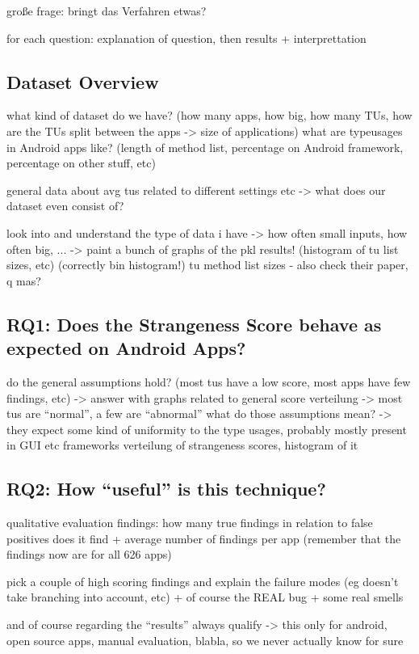 große frage: bringt das Verfahren etwas?

for each question: explanation of question, then results + interprettation
\subsection{Dataset Overview}
what kind of dataset do we have? (how many apps, how big, how many TUs, how are the TUs split between the apps -> size of applications)
what are typeusages in Android apps like? (length of method list, percentage on Android framework, percentage on other stuff, etc) 

general data about avg tus related to different settings etc -> what does our dataset even consist of?

look into and understand the type of data i have -> how often small inputs, how often big, ...
-> paint a bunch of graphs of the pkl results! (histogram of tu list sizes,  etc) (correctly bin histogram!)
 tu method list sizes - also check their paper, q mas?

\subsection{RQ1: Does the Strangeness Score behave as expected on Android Apps?}

do the general assumptions hold? (most tus have a low score, most apps have few findings, etc)
    -> answer with graphs related to general score verteilung
    -> most tus are ``normal'', a few are ``abnormal''
    what do those assumptions mean? -> they expect some kind of uniformity to the type usages, probably mostly present in GUI etc frameworks
verteilung of strangeness scores, histogram of it

\subsection{RQ2: How ``useful'' is this technique?}

qualitative evaluation findings:
how many true findings in relation to false positives does it find + average number of findings per app (remember that the findings now are for all 626 apps)

pick a couple of high scoring findings and explain the failure modes (eg doesn't take branching into account, etc)
+ of course the REAL bug + some real smells

and of course regarding the ``results'' always qualify -> this only for android, open source apps, manual evaluation, blabla, so we never actually know for sure

